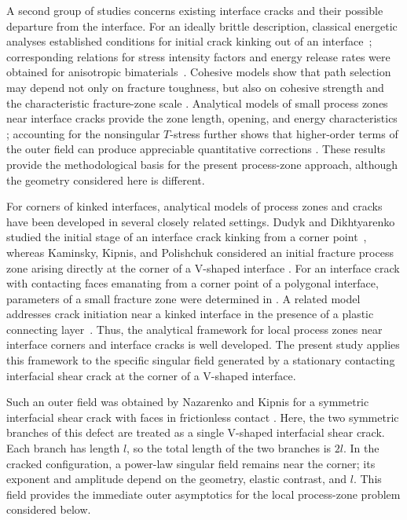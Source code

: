 \documentclass[pdflatex,onecolumn,sn-mathphys-ay]{sn-jnl}
\begin{document}
A second group of studies concerns existing interface cracks and their
possible departure from the interface. For an ideally brittle description,
classical energetic analyses established conditions for initial crack kinking
out of an interface~\citep{HeHutchinson1989}; corresponding relations for
stress intensity factors and energy release rates were obtained for
anisotropic bimaterials~\citep{Wang1994}. Cohesive models show that path
selection may depend not only on fracture toughness, but also on cohesive
strength and the characteristic fracture-zone scale
\citep{ParmigianiThouless2006}. Analytical models of small process zones near
interface cracks provide the zone length, opening, and energy characteristics
\citep{KaminskyEtAl2023}; accounting for the
nonsingular $T$-stress further shows that higher-order terms of the outer
field can produce appreciable quantitative corrections
\citep{KaminskyDudykChornoivan2026}. These results provide the methodological basis for the present process-zone
approach, although the geometry considered here is different.

For corners of kinked interfaces, analytical models of process zones and
cracks have been developed in several closely related settings.
Dudyk and Dikhtyarenko studied the initial stage of an interface crack
kinking from a corner point~\citeyearpar{DudykDikhtyarenko2012}, whereas Kaminsky,
Kipnis, and Polishchuk considered an initial fracture process zone arising
directly at the corner of a V-shaped interface
\citeyearpar{KaminskyKipnisPolishchuk2012}. For an interface crack with contacting
faces emanating from a corner point of a polygonal interface, parameters of a
small fracture zone were determined in
\citep{KaminskyDudykFenkiv2023}. A related model addresses crack initiation near a kinked interface in the
presence of a plastic connecting layer~\citep{KaminskyDudykPolishchuk2024}. Thus, the analytical framework for local process zones near interface
corners and interface cracks is well developed. The present study applies
this framework to the specific singular field generated by a stationary
contacting interfacial shear crack at the corner of a V-shaped interface.

Such an outer field was obtained by Nazarenko and Kipnis for a symmetric
interfacial shear crack with faces in frictionless contact
\citep{NazarenkoKipnis2022Stress}. Here, the two symmetric
branches of this defect are treated as a single V-shaped interfacial shear
crack. Each branch has length $l$, so the total length of the two branches is
$2l$. In the cracked configuration, a power-law singular field remains near
the corner; its exponent and amplitude depend on the geometry, elastic
contrast, and $l$. This field provides the immediate outer asymptotics for
the local process-zone problem considered below.
\end{document}
